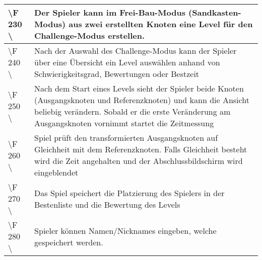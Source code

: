 \begin{tabular}{|p{}|p{}|}
\hline
\textbackslash F 230  \textbackslash  & Der Spieler kann im Frei-Bau-Modus (Sandkasten-Modus) aus zwei erstellten Knoten eine Level für den Challenge-Modus erstellen.\\
\hline
\textbackslash F 240  \textbackslash  & Nach der Auswahl des Challenge-Modus kann der Spieler über eine Übersicht ein Level auswählen anhand von Schwierigkeitsgrad, Bewertungen oder Bestzeit \\
\hline
\textbackslash F 250  \textbackslash  & Nach dem Start eines Levels sieht der Spieler beide Knoten (Ausgangsknoten und Referenzknoten) und kann die Ansicht beliebig verändern. Sobald er die erste Veränderung am Ausgangsknoten vornimmt startet die Zeitmessung\\
\hline
\textbackslash F 260  \textbackslash  & Spiel prüft den transformierten Ausgangsknoten auf Gleichheit mit dem Referenzknoten. Falls Gleichheit besteht wird die Zeit angehalten und der Abschlussbildschirm wird eingeblendet \\
\hline
\textbackslash F 270  \textbackslash  & Das Spiel speichert die Platzierung des Spielers in der Bestenliste und die Bewertung des Levels\\
\hline
\textbackslash F 280  \textbackslash  & Spieler können Namen/Nicknames eingeben, welche gespeichert werden.\\
\hline
\end{tabular} 
	

